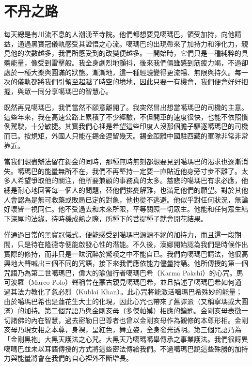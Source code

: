 \chapter{不丹之路}

每天總是有川流不息的人潮湧至寺院。他們都想要見噶瑪巴，領受加持，向他請益，通過黑寶冠儀軌感受其證悟之心流。噶瑪巴的出現帶來了加持力和淨化力，親見他的次數越多，我們所感受到的改變便越多。一開始時，它們只是一種純粹的具體能量，像受到雷擊般。我全身劇烈地顫抖，後來我們倆雖感到筋疲力竭，不過卻處於一種大樂與圓滿的狀態。漸漸地，這一種經驗變得更流暢、無限與持久。每一次的儀軌都將我們引領至超越了時空的境地，因此只要一有機會，我們便會好好把握，與眾一同分享噶瑪巴的智慧心。

既然再見噶瑪巴，我們當然不願意離開了。我突然冒出想當噶瑪巴的司機的主意。這些年來，我在高速公路上累積了不少經驗，不但開車的速度很快，也能不依照慣例駕駛，十分敏捷。其實我們心裡是希望這些印度人沒那個膽子驅逐噶瑪巴的司機而已。按規矩，外國人只能在錫金逗留幾天。錫金距離中國駐西藏的軍隊非常非常靠近。

當我們想盡辦法留在錫金的同時，那種無時無刻都想要見到噶瑪巴的渴求也逐漸消失。噶瑪巴的能量無所不在，我們不再堅持一定要一直貼近他身旁寸步不離了。太多人希望爭取他的關注，他所要兼顧的事務真的太多。慈悲的噶瑪巴有求必應，他總是耐心地回答每一個人的問題，替他們排憂解難，也滿足他們的願望。對於其他人會認為是無可救藥或敗局已定的對象，他也從不逃避。他似乎對任何狀況，無論好壞皆一視同仁。他不受過去和未來所限，平等關照一切眾生。他能和任何眾生結下深厚的法緣，待時機成熟之際，所種下的菩提種子就會開花結果。

僅通過日常的黑寶冠儀式，便能感受到噶瑪巴源源不絕的加持力，而且這一段期間，只是待在隆德寺便能啟發心性的潛能。不久後，漢娜開始認為我們是時候作出實際的修持，而非只是一昧沉醉於驚嘆之中不能自已。我們向噶瑪巴請法，他很高興地大聲喊出三個不同的咒語，接下來我們應依能力儘量持誦。他所傳授的第一個咒語乃為第二世噶瑪巴，偉大的瑜伽行者噶瑪巴希（Karma
Pakshi）的心咒。馬可波羅（Marco
Polo）聲稱曾在蒙古親見噶瑪巴希，並且描述了噶瑪巴希如何通過其法力教化了忽必烈（Kublai
Khan）。此心咒將能激活噶瑪巴希殊妙的能量；由於噶瑪巴希也是蓮花生大士的化現，因此心咒也帶來了舊譯派（又稱寧瑪或大圓滿）的加持。第二個咒語乃與金剛亥母（多傑帕嫫）相應的鑰匙。金剛亥母表徵一切諸佛的內在智慧，過去密勒日巴尊者也曾以金剛亥母作為觀修的本尊形相。金剛亥母乃現女相之本尊，身裸，呈紅色，舞立姿，全身發光透明。第三個咒語乃為「金剛黑袍」大黑天護法之心咒。大黑天乃噶瑪噶舉傳承之事業護法。我們很訝異噶嗎巴並未以耳語傳授的方式將這些密法傳給我們。不過噶瑪巴說這些殊勝的加持力與能量將會在我們的自心裡外不斷增長。

